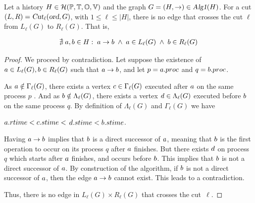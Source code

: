 \documentclass[12pt]{article}
\begin{document}
\begin{lemma}\label{lemma:noCrossingLlRl}
Let a history $H\in\mathcal{H}(\mathbb{P}, \mathbb{T}, \mathbb{O}, \mathbb{V})$ and the graph \mbox{$G=(H,\rightarrow)\in\textsl{Alg1}(H)$}. For a cut 
\mbox{$(L,R)=\textsl{Cut}_\ell(\textsl{ord},G)$}, with \mbox{$1\leq\ell\leq|H|$}, there is no edge that crosses the cut $\ell$ from $L_\ell(G)$ to $R_\ell(G)$. That is, 

\begin{gather*}
\nexists\; a,b\in H:\; a\rightarrow b\;\land\;a\in L_\ell(G)\;\land\;b\in R_\ell(G)
\end{gather*}
\end{lemma}
\begin{proof}
We proceed by contradiction. Let suppose the existence of $a\in L_\ell(G),b\in R_\ell(G)$ such that $a\rightarrow	b$, and let $p=a.proc$ and $q=b.proc$.

As $a\notin \Gamma_\ell(G)$, there exists a vertex $c\in \Gamma_\ell(G)$ executed after $a$ on the same process $p$ . And as $b\notin \Lambda_\ell(G)$, there exists a vertex $d\in \Lambda_\ell(G)$ executed before $b$ on the same process $q$. By definition of $\Lambda_\ell(G)$ and $\Gamma_\ell(G)$ we have

\begin{center}
$a.rtime<c.stime<$
$d.stime<b.stime$.
\end{center}

Having $a\rightarrow b$ implies that $b$ is a direct successor of $a$, meaning that $b$ is the first operation to occur on its process $q$ after $a$ finishes. But there exists $d$ on process $q$ which starts after $a$ finishes, and occurs before $b$. This implies that $b$ is not a direct successor of $a$. By construction of the algorithm, if $b$ is not a direct successor of $a$, then the edge $a\rightarrow b$ cannot exist. This leads to a contradiction.

Thus, there is no edge in $L_\ell(G)\times R_\ell(G)$ that crosses the cut~$\ell$.
\end{proof}
\end{document}
